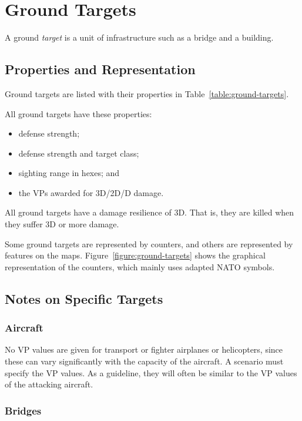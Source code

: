 \documentclass[10pt]{article}
\begin{document}
\clearpage
\section{Ground Targets}

A ground \emph{target} is a unit of infrastructure such as a bridge and a building.

\subsection{Properties and Representation}

Ground targets are listed with their properties in Table~\ref{table:ground-targets}.

All ground targets have these properties:
\begin{itemize}
    \item defense strength;
    \item defense strength and target class;
    \item sighting range in hexes; and
    \item the VPs awarded for 3D/2D/D damage.
\end{itemize}

All ground targets have a damage resilience of 3D. That is, they are killed when they suffer 3D or more damage.

Some ground targets are represented by counters, and others are represented by features on the maps. Figure~\ref{figure:ground-targets} shows the graphical representation of the counters, which mainly uses adapted NATO symbols.

\subsection{Notes on Specific Targets}

\subsubsection{Aircraft}

No VP values are given for transport or fighter airplanes or helicopters, since these can vary significantly with the capacity of the aircraft. A scenario must specify the VP values. As a guideline, they will often be similar to the VP values of the attacking aircraft.

\subsubsection{Bridges}
\end{document}
